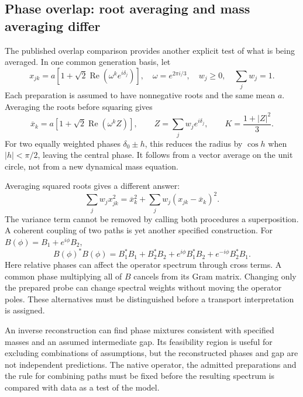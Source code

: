 \documentclass[11pt,a4paper]{article}
\begin{document}
\subsection{Phase overlap: root averaging and mass averaging differ}
The published overlap comparison provides another explicit test of
what is being averaged. In one common generation basis, let
\begin{equation}
 x_{jk}=a[1+\sqrt2\operatorname{Re}(\omega^ke^{i\delta_j})],
 \quad \omega=e^{2\pi i/3},\quad
 w_j\geq0,\quad\sum_jw_j=1.
\end{equation}
Each preparation is assumed to have nonnegative roots and the same
mean $a$. Averaging the roots before squaring gives
\begin{equation}
 \overline x_k=a[1+\sqrt2\operatorname{Re}(\omega^k Z)],
 \qquad Z=\sum_jw_je^{i\delta_j},\qquad
 K=\frac{1+|Z|^2}{3}.
\end{equation}
For two equally weighted phases $\delta_0\pm h$, this reduces the
radius by $\cos h$ when $|h|<\pi/2$, leaving the central phase.
It follows from a vector average on the unit circle, not from a
new dynamical mass equation.

Averaging squared roots gives a different answer:
\begin{equation}
 \sum_jw_jx_{jk}^2=\overline x_k^2+
                      \sum_jw_j(x_{jk}-\overline x_k)^2.
\end{equation}
The variance term cannot be removed by calling both procedures a
superposition. A coherent coupling of two paths is yet another
specified construction. For $B(\phi)=B_1+e^{i\phi}B_2$,
\begin{equation}
 B(\phi)^*B(\phi)=B_1^*B_1+B_2^*B_2+
 e^{i\phi}B_1^*B_2+e^{-i\phi}B_2^*B_1.
\end{equation}
Here relative phases can affect the operator spectrum through cross
terms. A common phase multiplying all of $B$ cancels from its Gram
matrix. Changing only the prepared probe can change spectral weights
without moving the operator poles. These alternatives must be
distinguished before a transport interpretation is assigned.

An inverse reconstruction can find phase mixtures consistent with
specified masses and an assumed intermediate gap. Its feasibility
region is useful for excluding combinations of assumptions, but the
reconstructed phases and gap are not independent predictions. The
native operator, the admitted preparations and the rule for combining
paths must be fixed before the resulting spectrum is compared with
data as a test of the model.
\end{document}
